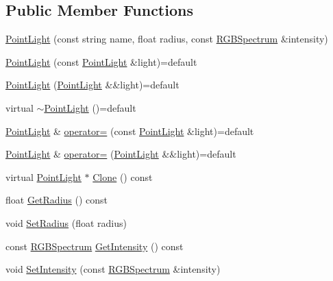 \subsection*{Public Member Functions}
\begin{DoxyCompactItemize}
\item 
\hyperlink{classmage_1_1_point_light_ac9d479055720799816d0489669cbd986}{Point\+Light} (const string name, float radius, const \hyperlink{structmage_1_1_r_g_b_spectrum}{R\+G\+B\+Spectrum} \&intensity)
\item 
\hyperlink{classmage_1_1_point_light_abc6ba4557ef81adbd1540de21698a2c8}{Point\+Light} (const \hyperlink{classmage_1_1_point_light}{Point\+Light} \&light)=default
\item 
\hyperlink{classmage_1_1_point_light_ab61a95b21bdd93e05fd00f177cd9fbd8}{Point\+Light} (\hyperlink{classmage_1_1_point_light}{Point\+Light} \&\&light)=default
\item 
virtual \hyperlink{classmage_1_1_point_light_ae76fc13ca85717694d55d1a3bb195a98}{$\sim$\+Point\+Light} ()=default
\item 
\hyperlink{classmage_1_1_point_light}{Point\+Light} \& \hyperlink{classmage_1_1_point_light_adf04c5a558c2b1200ee98efed4b6603b}{operator=} (const \hyperlink{classmage_1_1_point_light}{Point\+Light} \&light)=default
\item 
\hyperlink{classmage_1_1_point_light}{Point\+Light} \& \hyperlink{classmage_1_1_point_light_aa9f704206fe06f21ce0e70c82f7b6b1b}{operator=} (\hyperlink{classmage_1_1_point_light}{Point\+Light} \&\&light)=default
\item 
virtual \hyperlink{classmage_1_1_point_light}{Point\+Light} $\ast$ \hyperlink{classmage_1_1_point_light_a5a685d110af3ec491105147a15df7b87}{Clone} () const
\item 
float \hyperlink{classmage_1_1_point_light_a6321441e96d79caaacf40056beb288f2}{Get\+Radius} () const
\item 
void \hyperlink{classmage_1_1_point_light_ae7b4c301c148bd78348e26e5b6ad8faf}{Set\+Radius} (float radius)
\item 
const \hyperlink{structmage_1_1_r_g_b_spectrum}{R\+G\+B\+Spectrum} \hyperlink{classmage_1_1_point_light_a301e1bdbe55fa34472f9f529c8c4539e}{Get\+Intensity} () const
\item 
void \hyperlink{classmage_1_1_point_light_a40c0790159f687fd653a4792f8b39a21}{Set\+Intensity} (const \hyperlink{structmage_1_1_r_g_b_spectrum}{R\+G\+B\+Spectrum} \&intensity)
\end{DoxyCompactItemize}
